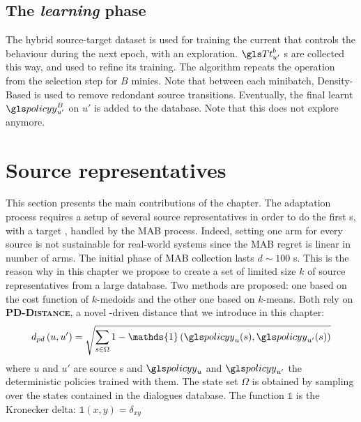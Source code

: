 \subsection{The \textit{learning} phase}

The hybrid source-target dataset is used for training the current  that controls the behaviour during the next epoch, with an  exploration. $\T^b_{u'}$ s are collected this way, and used to refine its training. The algorithm repeats the operation from the  selection step for $B$ minies. Note that between each minibatch, Density-Based is used to remove redondant source transitions. Eventually, the final learnt  $\policy^B_{u'}$ on $u'$ is added to the database. Note that this  does not explore anymore.


\section{Source representatives}
\label{sec:systemsrepresentatives}

This section presents the main contributions of the chapter. The adaptation process requires a setup of several source representatives in order to do the first s, with a target , handled by the \gls{MAB} process. Indeed, setting one arm for every source  is not sustainable for real-world systems since the  \gls{MAB} regret is linear in number of arms. The initial phase of \gls{MAB}  collection lasts $d \sim 100$ s. This is the reason why in this chapter we propose to create a set of limited size $k$ of source representatives from a large  database.
Two methods are proposed: one based on the cost function of $k$-medoids and the other one based on $k$-means.
Both rely on \textbf{\textsc{PD-Distance}}, a novel -driven distance that we introduce in this chapter:
\begin{equation}
    d_{pd}\left(u,u'\right) = \sqrt{\sum_{s\in\Omega}1 - \mathds{1}\left(\policy_{u}(s),\policy_{u'}(s)\right)}
\end{equation}
where $u$ and $u'$ are source s and $\policy_{u}$ and $\policy_{u'}$ the deterministic policies trained with them. The state set $\Omega$ is obtained by sampling over the states contained in the dialogues database. The function $\mathds{1}$ is the Kronecker delta: $\mathds{1}(x,y) = \delta_{xy}$

